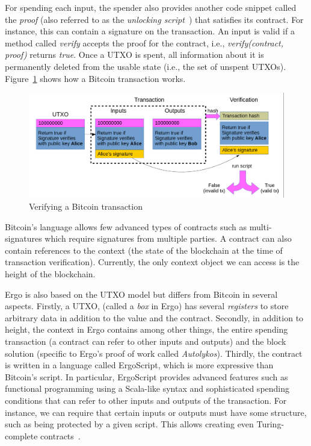\documentclass[]{llncs}   %
\begin{document}
For spending each input, the spender also provides another code snippet called the {\em proof} (also referred to as the {\em unlocking script}~\cite{Antonopoulos:2014:MBU:2695500}) that satisfies its contract. For instance, this can contain a signature on the transaction. An input is valid if a method called {\em verify} accepts the proof for the contract, i.e., {\em verify(contract, proof)} returns {\em true}. Once a UTXO is spent, all information about it is permanently deleted from the usable state (i.e., the set of unspent UTXOs). 
Figure~\ref{fig1} shows how a Bitcoin transaction works.
\begin{figure}
	\includegraphics[scale=0.24]{bitcoin}
	\caption{Verifying a Bitcoin transaction}
	\label{fig1}
\end{figure}

Bitcoin's language allows few advanced types of contracts such as multi-signatures which require signatures from multiple parties. A contract can also contain references to the context (the state of the blockchain at the time of transaction verification). Currently, the only context object we can access is the height of the blockchain. 

Ergo is also based on the UTXO model but differs from Bitcoin in several aspects. Firstly, a UTXO, (called a {\em box} in Ergo) has several {\em registers} to store arbitrary data in addition to the value and the contract. Secondly, in addition to height, the context in Ergo contains among other things, the entire spending transaction (a contract can refer to other inputs and outputs) and the block solution (specific to Ergo's proof of work called {\em Autolykos}).
Thirdly, the contract is written in a language called ErgoScript, which is more expressive than Bitcoin's script. In particular, ErgoScript provides advanced features such as functional programming using a Scala-like syntax and sophisticated spending conditions that can refer to other inputs and outputs of the transaction. For instance, we can require that certain inputs or outputs must have some structure, such as being protected by a given script.
This allows creating even Turing-complete contracts~\cite{chepurnoy2018self}.
\end{document}
